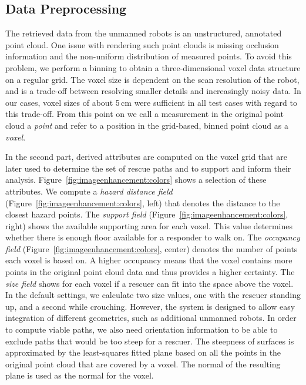 \documentclass{egpubl}
\begin{document}
\subsection{Data Preprocessing} \label{sec:overview:preprocessing}
The retrieved data from the unmanned robots is an unstructured, annotated point cloud. One issue with rendering such point clouds is missing occlusion information and the non-uniform distribution of measured points. To avoid this problem, we perform a binning to obtain a three-dimensional voxel data structure on a regular grid. The voxel size is dependent on the scan resolution of the robot, and is a trade-off between resolving smaller details and increasingly noisy data. In our cases, voxel sizes of about 5\,cm were sufficient in all test cases with regard to this trade-off. From this point on we call a measurement in the original point cloud a \emph{point} and refer to a position in the grid-based, binned point cloud as a \emph{voxel}.

 In the second part, derived attributes are computed on the voxel grid that are later used to determine the set of rescue paths and to support and inform their analysis. Figure~\ref{fig:imageenhancement:colors} shows a selection of these attributes. We compute a \emph{hazard distance field} (Figure~\ref{fig:imageenhancement:colors}, left) that denotes the distance to the closest hazard points. The \emph{support field} (Figure~\ref{fig:imageenhancement:colors}, right) shows the available supporting area for each voxel. This value determines whether there is enough floor available for a responder to walk on. The \emph{occupancy field} (Figure~\ref{fig:imageenhancement:colors}, center) denotes the number of points each voxel is based on. A higher occupancy means that the voxel contains more points in the original point cloud data and thus provides a higher certainty. The \emph{size field} shows for each voxel if a rescuer can fit into the space above the voxel. In the default settings, we calculate two size values, one with the rescuer standing up, and a second while crouching. However, the system is designed to allow easy integration of different geometries, such as additional unmanned robots. In order to compute viable paths, we also need orientation information to be able to exclude paths that would be too steep for a rescuer. The steepness of surfaces is approximated by the least-squares fitted plane based on all the points in the original point cloud that are covered by a voxel. The normal of the resulting plane is used as the normal for the voxel.
\end{document}
